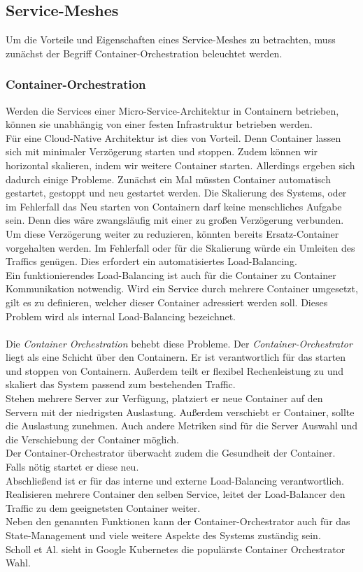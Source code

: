 \subsection{Service-Meshes}
Um die Vorteile und Eigenschaften eines Service-Meshes zu betrachten, muss zunächst der Begriff Container-Orchestration beleuchtet werden.
\subsubsection{Container-Orchestration}
Werden die Services einer Micro-Service-Architektur in Containern betrieben, können sie unabhängig von einer festen Infrastruktur betrieben werden.\\
Für eine Cloud-Native Architektur ist dies von Vorteil. Denn Container lassen sich mit minimaler Verzögerung starten und stoppen. Zudem können wir horizontal skalieren, indem wir weitere Container starten. Allerdings ergeben sich dadurch einige Probleme. Zunächst ein Mal müssten Container automatisch gestartet, gestoppt und neu gestartet werden. Die Skalierung des Systems, oder im Fehlerfall das Neu starten von Containern darf keine menschliches Aufgabe sein. Denn dies wäre zwangsläufig mit einer zu großen Verzögerung verbunden.\\
Um diese Verzögerung weiter zu reduzieren, könnten bereits Ersatz-Container vorgehalten werden. Im Fehlerfall oder für die Skalierung würde ein Umleiten des Traffics genügen. Dies erfordert ein automatisiertes Load-Balancing.\\
Ein funktionierendes Load-Balancing ist auch für die Container zu Container Kommunikation notwendig. Wird ein Service durch mehrere Container umgesetzt, gilt es zu definieren, welcher dieser Container adressiert werden soll. Dieses Problem wird als internal Load-Balancing bezeichnet. \\\\

Die\textit{ Container Orchestration}\cite{scholl_cloud_2019} behebt diese Probleme. Der \textit{Container-Orchestrator} liegt als eine Schicht über den Containern. Er ist verantwortlich für das starten und stoppen von Containern. Außerdem teilt er flexibel Rechenleistung zu und skaliert das System passend zum bestehenden Traffic.\\
Stehen mehrere Server zur Verfügung, platziert er neue Container auf den Servern mit der niedrigsten Auslastung. Außerdem verschiebt er Container, sollte die Auslastung zunehmen. Auch andere Metriken sind für die Server Auswahl und die Verschiebung der Container möglich.\\
Der Container-Orchestrator überwacht zudem die Gesundheit der Container. Falls nötig startet er diese neu.\\
Abschließend ist er für das interne und externe Load-Balancing verantwortlich. Realisieren mehrere Container den selben Service, leitet der Load-Balancer den Traffic zu dem geeignetsten Container weiter. \\
Neben den genannten Funktionen kann der Container-Orchestrator auch für das State-Management und viele weitere Aspekte des Systems zuständig sein.\\
Scholl et Al.\cite{scholl_cloud_2019} sieht in Google Kubernetes \cite{kubernetes_production-grade_nodate} die populärste Container Orchestrator Wahl.
